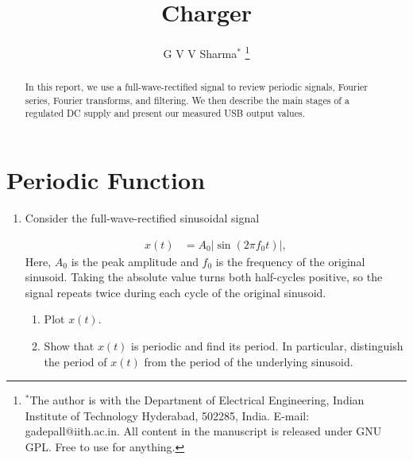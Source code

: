 \documentclass[journal,12pt,twocolumn]{IEEEtran}
\renewcommand\thesection{\arabic{section}}
\theoremstyle{definition}
\providecommand{\brak}[1]{\ensuremath{\left(#1\right)}}
\theoremstyle{remark}
\providecommand{\abs}[1]{\left\vert#1\right\vert}
\numberwithin{equation}{section}
\begin{document}
\title{Charger}
\author{G V V Sharma$^{*}$
\thanks{$^{*}$The author is with the Department of Electrical Engineering,
Indian Institute of Technology Hyderabad, 502285, India.
E-mail: gadepall@iith.ac.in. All content in the manuscript is released
under GNU GPL. Free to use for anything.}}
\maketitle

\begin{abstract}
In this report, we use a full-wave-rectified signal to review periodic signals, Fourier series, Fourier transforms, and filtering. We then describe the main stages of a regulated DC supply and present our measured USB output values.
\end{abstract}

\section{Periodic Function}
\begin{enumerate}[label=\thesection.\arabic*.,ref=\thesection.\theenumi]
\item Consider the full-wave-rectified sinusoidal signal

\begin{align}
    x(t) &= A_0\abs{\sin\brak{2\pi f_0 t}},
    \label{eq:10-orig-diff-def}
\end{align}
Here, $A_0$ is the peak amplitude and $f_0$ is the frequency of the original sinusoid. Taking the absolute value turns both half-cycles positive, so the signal repeats twice during each cycle of the original sinusoid.

\begin{enumerate}[label=\thesection.\arabic*,
                  ref=\thesection.\theenumi]
    \item Plot $x(t)$.
    \item Show that $x(t)$ is periodic and find its period. In particular, distinguish the period of $x(t)$ from the period of the underlying sinusoid.
\end{enumerate}
\end{enumerate}

\FloatBarrier
\end{document}
